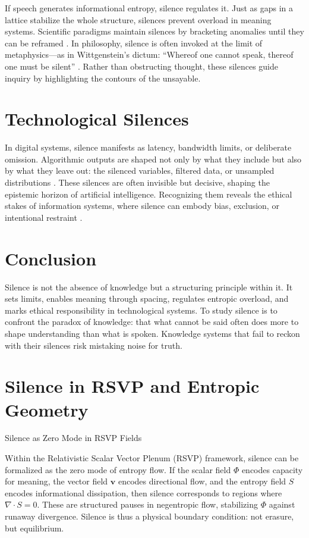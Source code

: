 \documentclass[11pt,a4paper]{article}
\begin{document}
If speech generates informational entropy, silence regulates it. Just as gaps in a lattice stabilize the whole structure, silences prevent overload in meaning systems. Scientific paradigms maintain silences by bracketing anomalies until they can be reframed \citep{kuhn1962}. In philosophy, silence is often invoked at the limit of metaphysics—as in Wittgenstein’s dictum: “Whereof one cannot speak, thereof one must be silent” \citep{wittgenstein1961}. Rather than obstructing thought, these silences guide inquiry by highlighting the contours of the unsayable.

\section{Technological Silences}

In digital systems, silence manifests as latency, bandwidth limits, or deliberate omission. Algorithmic outputs are shaped not only by what they include but also by what they leave out: the silenced variables, filtered data, or unsampled distributions \citep{gitelman2013}. These silences are often invisible but decisive, shaping the epistemic horizon of artificial intelligence. Recognizing them reveals the ethical stakes of information systems, where silence can embody bias, exclusion, or intentional restraint \citep{benjamin2019}.

\section{Conclusion}

Silence is not the absence of knowledge but a structuring principle within it. It sets limits, enables meaning through spacing, regulates entropic overload, and marks ethical responsibility in technological systems. To study silence is to confront the paradox of knowledge: that what cannot be said often does more to shape understanding than what is spoken. Knowledge systems that fail to reckon with their silences risk mistaking noise for truth.

\appendix

\section{Silence in RSVP and Entropic Geometry}
\label{app:a}

Silence as Zero Mode in RSVP Fields

Within the Relativistic Scalar Vector Plenum (RSVP) framework, silence can be formalized as the zero mode of entropy flow. If the scalar field $\Phi$ encodes capacity for meaning, the vector field $\mathbf{v}$ encodes directional flow, and the entropy field $S$ encodes informational dissipation, then silence corresponds to regions where $\nabla \cdot S = 0$. These are structured pauses in negentropic flow, stabilizing $\Phi$ against runaway divergence. Silence is thus a physical boundary condition: not erasure, but equilibrium.
\end{document}
